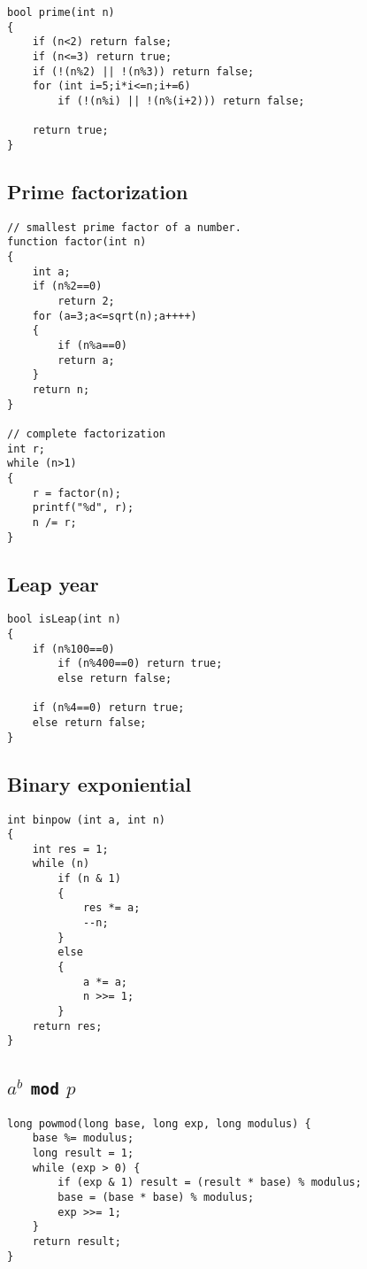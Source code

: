 \documentclass[a4paper]{article}
\begin{document}
\begin{verbatim}
bool prime(int n)
{
	if (n<2) return false;
	if (n<=3) return true;
	if (!(n%2) || !(n%3)) return false;
	for (int i=5;i*i<=n;i+=6)
		if (!(n%i) || !(n%(i+2))) return false;
		
	return true;
}
\end{verbatim}

\subsection{Prime factorization}

\begin{verbatim}
// smallest prime factor of a number.
function factor(int n)
{
	int a;
	if (n%2==0)
		return 2;
	for (a=3;a<=sqrt(n);a++++)
	{
		if (n%a==0)
		return a;
	}
	return n;
}

// complete factorization
int r;
while (n>1)
{
    r = factor(n);
    printf("%d", r);
    n /= r;
}
\end{verbatim}

\subsection{Leap year}

\begin{verbatim}
bool isLeap(int n)
{
	if (n%100==0)
		if (n%400==0) return true;
		else return false;

	if (n%4==0) return true;
	else return false;
}
\end{verbatim}

\subsection{Binary exponiential}

\begin{verbatim}
int binpow (int a, int n)
{
	int res = 1;
	while (n)
		if (n & 1)
		{
			res *= a;
			--n;
		}
		else
		{
			a *= a;
			n >>= 1;
		}
	return res;
}
\end{verbatim}

\subsection{$a^b$ \texttt{mod} $p$}
\begin{verbatim}
long powmod(long base, long exp, long modulus) {
	base %= modulus;
	long result = 1;
	while (exp > 0) {
		if (exp & 1) result = (result * base) % modulus;
		base = (base * base) % modulus;
		exp >>= 1;
	}
	return result;
}
\end{verbatim}
\end{document}
